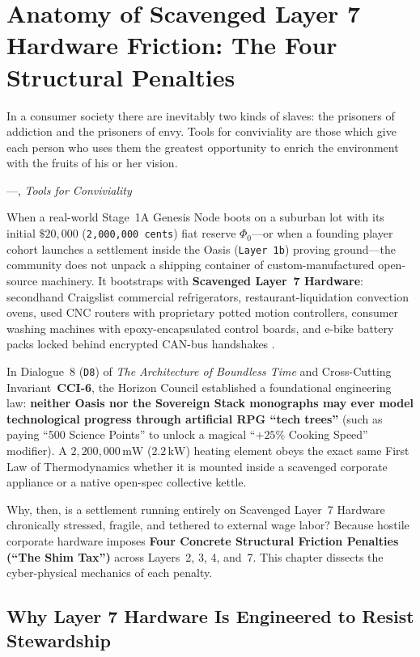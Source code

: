 \chapter{Anatomy of Scavenged Layer 7 Hardware Friction: The Four Structural Penalties}
\label{ch:l7-scavenged-hardware-friction}

\epigraph{In a consumer society there are inevitably two kinds of slaves: the prisoners of addiction and the prisoners of envy. Tools for conviviality are those which give each person who uses them the greatest opportunity to enrich the environment with the fruits of his or her vision.}{---\textcite{illich1973}, \textit{Tools for Conviviality}}

When a real-world Stage~1A Genesis Node boots on a suburban lot with its initial $\$20{,}000$ (\texttt{2,000,000 cents}) fiat reserve $\Phi_0$---or when a founding player cohort launches a settlement inside the Oasis (\texttt{Layer~1b}) proving ground---the community does not unpack a shipping container of custom-manufactured open-source machinery. It bootstraps with \textbf{Scavenged Layer~7 Hardware}: secondhand Craigslist commercial refrigerators, restaurant-liquidation convection ovens, used CNC routers with proprietary potted motion controllers, consumer washing machines with epoxy-encapsulated control boards, and e-bike battery packs locked behind encrypted CAN-bus handshakes \parencite{perzanowski2022right}.

In Dialogue~8 (\texttt{D8}) of \textit{The Architecture of Boundless Time} and Cross-Cutting Invariant~\textbf{CCI-6}, the Horizon Council established a foundational engineering law: \textbf{neither Oasis nor the Sovereign Stack monographs may ever model technological progress through artificial RPG ``tech trees''} (such as paying ``500 Science Points'' to unlock a magical ``$+25\%$ Cooking Speed'' modifier). A $2{,}200{,}000\,\mathrm{mW}$ ($2.2\,\mathrm{kW}$) heating element obeys the exact same First Law of Thermodynamics whether it is mounted inside a scavenged corporate appliance or a native open-spec collective kettle.

Why, then, is a settlement running entirely on Scavenged Layer~7 Hardware chronically stressed, fragile, and tethered to external wage labor? Because hostile corporate hardware imposes \textbf{Four Concrete Structural Friction Penalties (``The Shim Tax'')} across Layers~2, 3, 4, and~7. This chapter dissects the cyber-physical mechanics of each penalty.

\section{Why Layer 7 Hardware Is Engineered to Resist Stewardship}
\label{sec:l7-planned-obsolescence}

